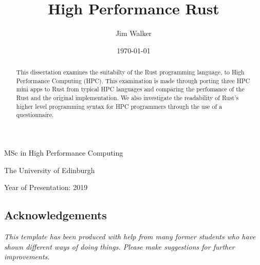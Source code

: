 \documentclass[12pt,a4paper]{report}
\begin{document}





\title{High Performance Rust}
\author{Jim Walker}
\date{\today}

\makeEPCCtitle

\thispagestyle{empty}

\vspace{12cm}

\begin{center}

\large{MSc in High Performance Computing}

\large{The University of Edinburgh}

\large{Year of Presentation: 2019}

\end{center}

\newpage

\begin{abstract}
This dissertation examines the suitabilty of the Rust programming language, to High Performance Computing (HPC). This examination is made through porting three HPC mini apps to Rust from typical HPC languages and comparing the perfomance of the Rust and the original implementation. We also investigate the readability of Rust's higher level programming syntax for HPC programmers through the use of a questionnaire.
\end{abstract}


\tableofcontents
\listoftables
\listoffigures
\lstlistoflistings

\begin{titlepage}
\vspace*{2in}
\section*{Acknowledgements}

{\em This template has been produced with help from many former students who
have shown different ways of doing things. Please make suggestions for
further improvements.}

\end{titlepage}
\end{document}
